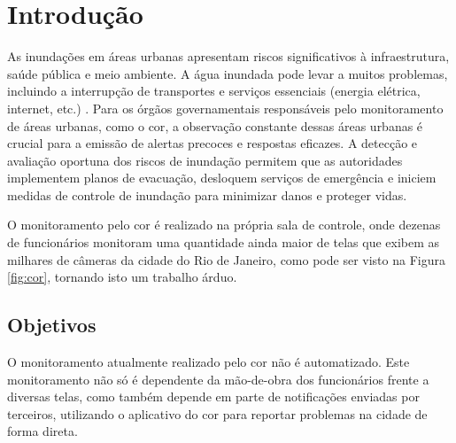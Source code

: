 



\chapter{Introdução}
\label{cap:introducao}

As inundações em áreas urbanas apresentam riscos significativos à infraestrutura, saúde pública e meio ambiente. A água inundada pode levar a muitos problemas, incluindo a interrupção de transportes e serviços essenciais (energia elétrica, internet, etc.) . 
Para os órgãos governamentais responsáveis pelo monitoramento de áreas urbanas, como o \acrfull{cor}, a observação constante dessas áreas urbanas é crucial para a emissão de alertas precoces e respostas eficazes. 
A detecção e avaliação oportuna dos riscos de inundação permitem que as autoridades implementem planos de evacuação, desloquem serviços de emergência e iniciem medidas de controle de inundação para minimizar danos e proteger vidas.

O monitoramento pelo \acrshort{cor} é realizado na própria sala de controle, onde dezenas de funcionários monitoram uma quantidade ainda maior de telas que exibem as milhares de câmeras da cidade do Rio de Janeiro, como pode ser visto na Figura \ref{fig:cor}, tornando isto um trabalho árduo.

\section{Objetivos}

O monitoramento atualmente realizado pelo \acrshort{cor} não é automatizado. Este monitoramento não só é dependente da mão-de-obra dos funcionários frente a diversas telas, como também depende em parte de notificações enviadas por terceiros, utilizando o aplicativo do \acrshort{cor} para reportar problemas na cidade de forma direta.

